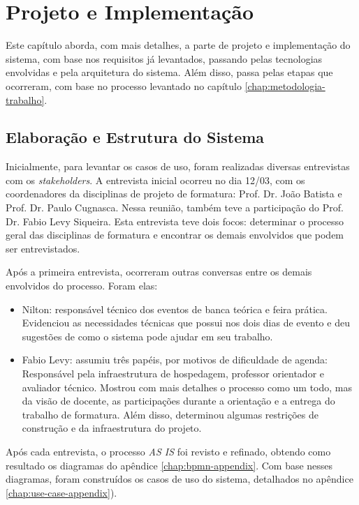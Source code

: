 \chapter{Projeto e Implementação}\label{chap:projeto-implementacao}
Este capítulo aborda, com mais detalhes, a parte de projeto e implementação do sistema, com base nos requisitos já levantados, passando pelas tecnologias envolvidas e pela arquitetura do sistema. Além disso, passa pelas etapas que ocorreram, com base no processo levantado no capítulo \ref{chap:metodologia-trabalho}.

\section{Elaboração e Estrutura do Sistema}
Inicialmente, para levantar os casos de uso, foram realizadas diversas entrevistas com os \textit{stakeholders}. A entrevista inicial ocorreu no dia 12/03, com os coordenadores da disciplinas de projeto de formatura: Prof. Dr. João Batista e Prof. Dr. Paulo Cugnasca. Nessa reunião, também teve a participação do Prof. Dr. Fabio Levy Siqueira. Esta entrevista teve dois focos: determinar o processo geral das disciplinas de formatura e encontrar os demais envolvidos que podem ser entrevistados.

Após a primeira entrevista, ocorreram outras conversas entre os demais envolvidos do processo. Foram elas:

\begin{itemize}
    \item Nilton: responsável técnico dos eventos de banca teórica e feira prática. Evidenciou as necessidades técnicas que possui nos dois dias de evento e deu sugestões de como o sistema pode ajudar em seu trabalho.
    \item Fabio Levy: assumiu três papéis, por motivos de dificuldade de agenda: Responsável pela infraestrutura de hospedagem, professor orientador e avaliador técnico. Mostrou com mais detalhes o processo como um todo, mas da visão de docente, as participações durante a orientação e a entrega do trabalho de formatura. Além disso, determinou algumas restrições de construção e da infraestrutura do projeto.
\end{itemize}

Após cada entrevista, o processo \textit{AS IS} foi revisto e refinado, obtendo como resultado os diagramas do apêndice \ref{chap:bpmn-appendix}. Com base nesses diagramas, foram construídos os casos de uso do sistema, detalhados no apêndice \ref{chap:use-case-appendix}). 

